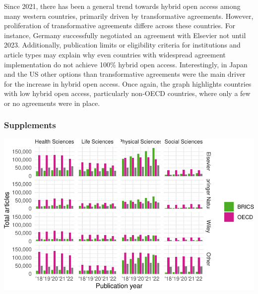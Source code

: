 \documentclass[a4paper,man,floatsintext,longtable,noextraspace,12pt]{apa6}
\begin{document}
Since 2021, there has been a general trend towards hybrid open access
among many western countries, primarily driven by transformative
agreements. However, proliferation of transformative agreements differe
across these countries. For instance, Germany successfully negotiated an
agreement with Elsevier not until 2023. Additionally, publication limits
or eligibility criteria for institutions and article types may explain
why even countries with widespread agreement implementation do not
achieve 100\% hybrid open access. Interestingly, in Japan and the US
other options than transformative agreements were the main driver for
the increase in hybrid open access. Once again, the graph highlights
countries with low hybrid open access, particularly non-OECD countries,
where only a few or no agreements were in place.

\hypertarget{supplements}{%
\subsubsection{Supplements}\label{supplements}}

\begin{center}\includegraphics[width=0.99\linewidth]{fig/unnamed-chunk-10-1} \end{center}
\end{document}
